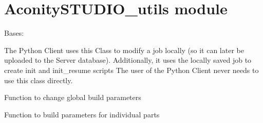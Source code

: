 \documentclass[letterpaper,10pt,english,openany,oneside]{sphinxmanual}
\begin{document}
\section{AconitySTUDIO\_utils module}
\label{\detokenize{_modules/AconitySTUDIO_utils:module-AconitySTUDIO_utils}}\label{\detokenize{_modules/AconitySTUDIO_utils:aconitystudio-utils-module}}\label{\detokenize{_modules/AconitySTUDIO_utils::doc}}

\begin{fulllineitems}
\label{\detokenize{_modules/AconitySTUDIO_utils:AconitySTUDIO_utils.JobHandler}}
Bases: 

The Python Client uses this Class to modify a job locally (so it can later be uploaded to the Server database).
Additionally, it uses the locally saved job to create init and init\_resume scripts
The user of the Python Client never needs to use this class directly.

\begin{fulllineitems}
\label{\detokenize{_modules/AconitySTUDIO_utils:AconitySTUDIO_utils.JobHandler.change_global_parameter}}
Function to change global build parameters

\end{fulllineitems}


\begin{fulllineitems}
\label{\detokenize{_modules/AconitySTUDIO_utils:AconitySTUDIO_utils.JobHandler.change_part_parameter}}
Function to build parameters for individual parts


\end{fulllineitems}
\end{fulllineitems}
\end{document}
